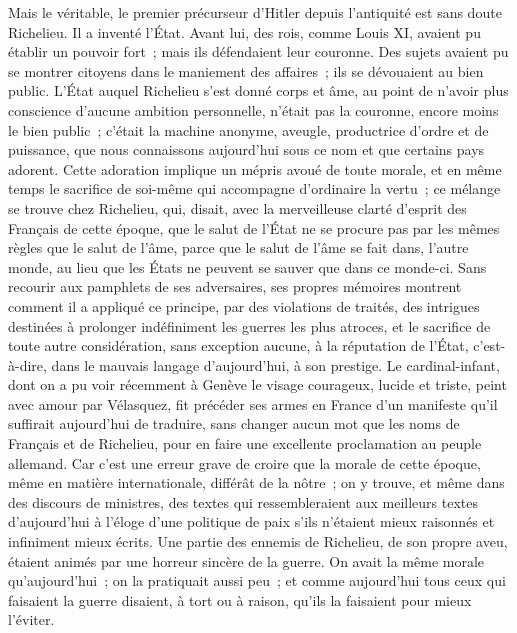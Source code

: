 \documentclass[french,twoside]{book} %
\begin{document}
Mais le véritable, le premier précurseur d'Hitler depuis l'antiquité est sans doute Richelieu. Il a inventé l'État. Avant lui, des rois, comme Louis XI, avaient pu établir un pouvoir fort ; mais ils défendaient leur couronne. Des sujets avaient pu se montrer citoyens dans le maniement des affaires ; ils se dévouaient au bien public. L'État auquel Richelieu s'est donné corps et âme, au point de n'avoir plus conscience d'aucune ambition personnelle, n'était pas la couronne, encore moins le bien public ; c'était la machine anonyme, aveu­gle, productrice d'ordre et de puissance, que nous connaissons aujourd'hui sous ce nom et que certains pays adorent. Cette adoration implique un mépris avoué de toute morale, et en même temps le sacrifice de soi-même qui accompagne d'ordinaire la vertu ; ce mélange se trouve chez Richelieu, qui, disait, avec la merveilleuse clarté d'esprit des Français de cette époque, que le salut de l'État ne se procure pas par les mêmes règles que le salut de l'âme, parce que le salut de l'âme se fait dans, l'autre monde, au lieu que les États ne peuvent se sauver que dans ce monde-ci. Sans recourir aux pamphlets de ses adversaires, ses propres mémoires montrent comment il a appliqué ce princi­pe, par des violations de traités, des intrigues destinées à prolonger indéfini­ment les guerres les plus atroces, et le sacrifice de toute autre considération, sans exception aucune, à la réputation de l'État, c'est-à-dire, dans le mauvais langage d'aujourd'hui, à son prestige. Le cardinal-infant, dont on a pu voir récemment à Genève le visage courageux, lucide et triste, peint avec amour par Vélasquez, fit précéder ses armes en France d'un manifeste qu'il suffirait aujourd’hui de traduire, sans changer aucun mot que les noms de Français et de Richelieu, pour en faire une excellente proclamation au peuple allemand. Car c'est une erreur grave de croire que la morale de cette époque, même en matière internationale, différât de la nôtre ; on y trouve, et même dans des discours de ministres, des textes qui ressembleraient aux meilleurs textes d'aujourd'hui à l'éloge d'une politique de paix s'ils n'étaient mieux raisonnés et infiniment mieux écrits. Une partie des ennemis de Richelieu, de son propre aveu, étaient animés par une horreur sincère de la guerre. On avait la même morale qu'aujourd'hui ; on la pratiquait aussi peu ; et comme aujourd'hui tous ceux qui faisaient la guerre disaient, à tort ou à raison, qu'ils la faisaient pour mieux l'éviter.\par
\end{document}
